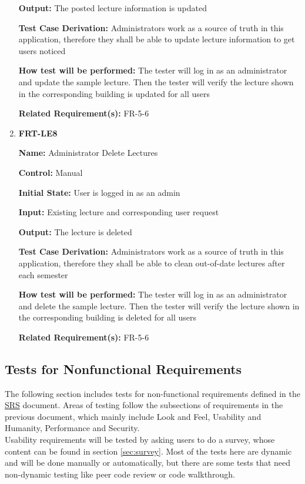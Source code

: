 \documentclass[12pt, titlepage]{article}
\begin{document}
\begin{enumerate}
\textbf{Output:} The posted lecture information is updated

\textbf{Test Case Derivation:} Administrators work as a source of truth in this application, therefore they shall be able to update lecture information to get users noticed
					
\textbf{How test will be performed:} The tester will log in as an administrator and update the sample lecture. Then the tester will verify the lecture shown in the corresponding building is updated for all users

\textbf{Related Requirement(s):} FR-5-6

\item{\textbf{FRT-LE8}}

\textbf{Name:} Administrator Delete Lectures

\textbf{Control:} Manual
					
\textbf{Initial State:} User is logged in as an admin

\textbf{Input:} Existing lecture and corresponding user request
					
\textbf{Output:} The lecture is deleted

\textbf{Test Case Derivation:} Administrators work as a source of truth in this application, therefore they shall be able to clean out-of-date lectures after each semester
					
\textbf{How test will be performed:} The tester will log in as an administrator and delete the sample lecture. Then the tester will verify the lecture shown in the corresponding building is deleted for all users

\textbf{Related Requirement(s):} FR-5-6
\end{enumerate}

\subsection{Tests for Nonfunctional Requirements}

The following section includes tests for non-functional requirements defined in the \href{https://github.com/beatlepie/4G06CapstoneProjectTeam2/blob/main/docs/SRS-Volere/SRS.pdf}{SRS} document. Areas of testing follow the subsections of requirements in the previous document, which mainly include Look and Feel, Usability and Humanity, Performance and Security.\\ Usability requirements will be tested by asking users to do a survey, whose content can be found in section \ref{sec:survey}. Most of the tests here are dynamic and will be done manually or automatically, but there are some tests that need non-dynamic testing like peer code review or code walkthrough.
\end{document}
